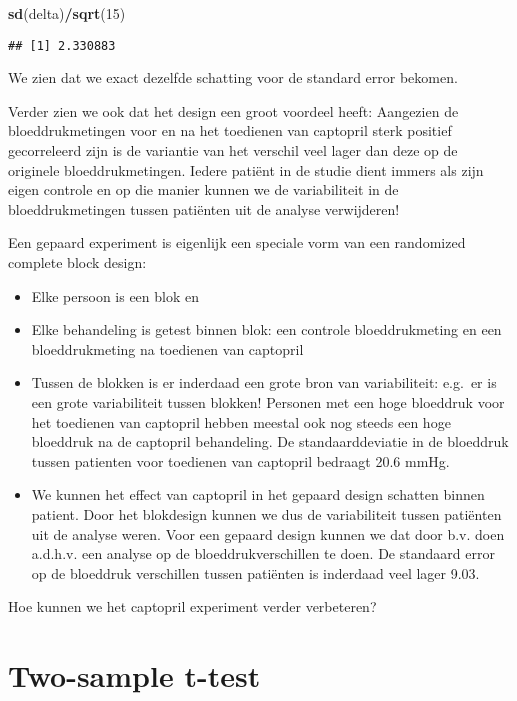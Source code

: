 \documentclass[
  12pt,dutch,coursenotes]{book}
\newenvironment{Shaded}{\begin{snugshade}}{\end{snugshade}}
\newcommand{\DecValTok}[1]{\textcolor[rgb]{0.00,0.00,0.81}{#1}}
\newcommand{\KeywordTok}[1]{\textcolor[rgb]{0.13,0.29,0.53}{\textbf{#1}}}
\newcommand{\NormalTok}[1]{#1}
\newcommand{\OperatorTok}[1]{\textcolor[rgb]{0.81,0.36,0.00}{\textbf{#1}}}
\theoremstyle{definition}
\theoremstyle{definition}
\theoremstyle{definition}
\theoremstyle{remark}
\begin{document}
\begin{Shaded}
\begin{Highlighting}[]
\KeywordTok{sd}\NormalTok{(delta)}\OperatorTok{/}\KeywordTok{sqrt}\NormalTok{(}\DecValTok{15}\NormalTok{)}
\end{Highlighting}
\end{Shaded}

\begin{verbatim}
## [1] 2.330883
\end{verbatim}

We zien dat we exact dezelfde schatting voor de standard error bekomen.

Verder zien we ook dat het design een groot voordeel heeft:
Aangezien de bloeddrukmetingen voor en na het toedienen van captopril sterk positief gecorreleerd zijn is de variantie van het verschil veel lager dan deze op de originele bloeddrukmetingen.
Iedere patiënt in de studie dient immers als zijn eigen controle en op die manier kunnen we de variabiliteit in de bloeddrukmetingen tussen patiënten uit de analyse verwijderen!

Een gepaard experiment is eigenlijk een speciale vorm van een randomized complete block design:

\begin{itemize}
\item
  Elke persoon is een blok en
\item
  Elke behandeling is getest binnen blok: een controle bloeddrukmeting en een bloeddrukmeting na toedienen van captopril
\item
  Tussen de blokken is er inderdaad een grote bron van variabiliteit: e.g.~er is een grote variabiliteit tussen blokken! Personen met een hoge bloeddruk voor het toedienen van captopril hebben meestal ook nog steeds een hoge bloeddruk na de captopril behandeling. De standaarddeviatie in de bloeddruk tussen patienten voor toedienen van captopril bedraagt 20.6 mmHg.
\item
  We kunnen het effect van captopril in het gepaard design schatten binnen patient. Door het blokdesign kunnen we dus de variabiliteit tussen patiënten uit de analyse weren. Voor een gepaard design kunnen we dat door b.v. doen a.d.h.v. een analyse op de bloeddrukverschillen te doen. De standaard error op de bloeddruk verschillen tussen patiënten is inderdaad veel lager 9.03.
\end{itemize}

Hoe kunnen we het captopril experiment verder verbeteren?

\hypertarget{two-sample-t-test}{%
\section{Two-sample t-test}\label{two-sample-t-test}}
\end{document}
